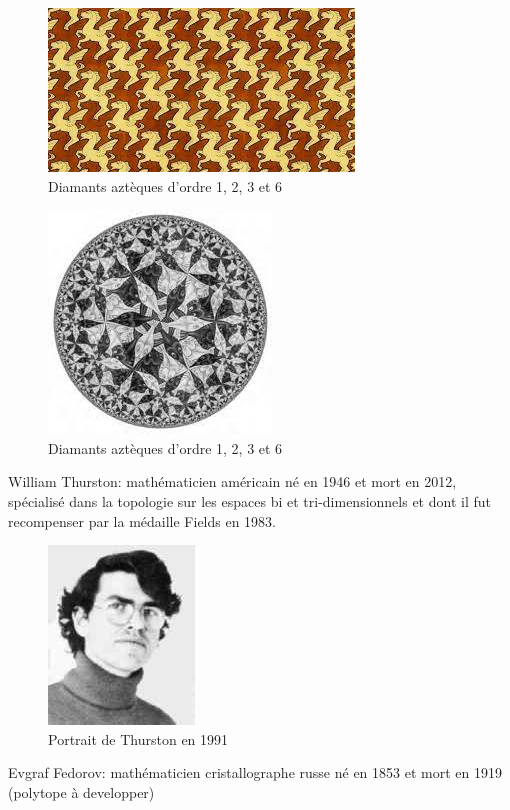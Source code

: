 \documentclass{article}
\begin{document}
\begin{figure} [!h]
    \center
    \includegraphics [scale=0.5] {image/dessin2_escherjpg.jpg}
    \caption{Diamants aztèques d'ordre 1, 2, 3 et 6}
\end{figure}

\begin{figure} [!h]
    \center
    \includegraphics [scale=0.5] {image/dessin3_escher.jpg}
    \caption{Diamants aztèques d'ordre 1, 2, 3 et 6}
\end{figure}

William Thurston: mathématicien américain né en 1946 et mort en 2012, spécialisé dans la topologie sur les espaces bi et tri-dimensionnels et dont il fut recompenser par la médaille Fields en 1983.

\begin{figure} [!h]
    \center
    \includegraphics [scale=0.5] {image/thurston.jpg}
    \caption{Portrait de Thurston en 1991}
\end{figure}

Evgraf Fedorov: mathématicien cristallographe russe né en 1853 et mort en 1919 (polytope à developper)
\end{document}
